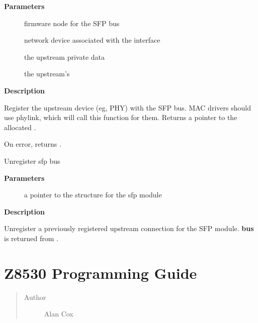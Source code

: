 \documentclass[a4paper,8pt,english]{sphinxmanual}
\begin{document}
\textbf{Parameters}
\begin{description}
\item[{}] \leavevmode
firmware node for the SFP bus

\item[{}] \leavevmode
network device associated with the interface

\item[{}] \leavevmode
the upstream private data

\item[{}] \leavevmode
the upstream's {\hyperref[networking/kapi:c.sfp_upstream_ops]{\emph{}}}

\end{description}

\textbf{Description}

Register the upstream device (eg, PHY) with the SFP bus. MAC drivers
should use phylink, which will call this function for them. Returns
a pointer to the allocated {\hyperref[networking/kapi:c.sfp_bus]{\emph{}}}.

On error, returns .

\begin{fulllineitems}
\label{networking/kapi:c.sfp_unregister_upstream}
Unregister sfp bus

\end{fulllineitems}


\textbf{Parameters}
\begin{description}
\item[{}] \leavevmode
a pointer to the {\hyperref[networking/kapi:c.sfp_bus]{\emph{}}} structure for the sfp module

\end{description}

\textbf{Description}

Unregister a previously registered upstream connection for the SFP
module. \textbf{bus} is returned from {\hyperref[networking/kapi:c.sfp_register_upstream]{\emph{}}}.


\chapter{Z8530 Programming Guide}
\label{networking/z8530book::doc}\label{networking/z8530book:z8530-programming-guide}\begin{quote}\begin{description}
\item[{Author}] \leavevmode
Alan Cox

\end{description}\end{quote}
\end{document}
